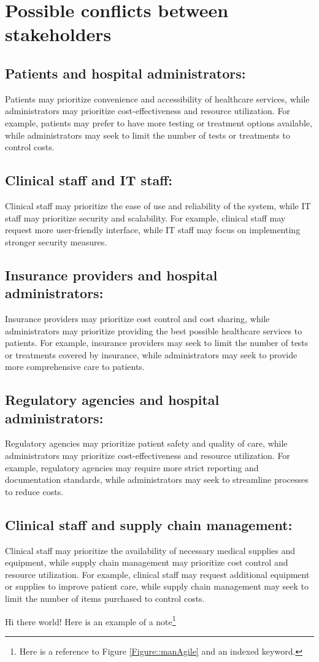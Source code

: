  \section{Possible conflicts between stakeholders}
\subsection{Patients and hospital administrators:} Patients may prioritize convenience and accessibility of healthcare services, while administrators may prioritize cost-effectiveness and resource utilization. For example, patients may prefer to have more testing or treatment options available, while administrators may seek to limit the number of tests or treatments to control costs.
\subsection{Clinical staff and IT staff:} Clinical staff may prioritize the ease of use and reliability of the system, while IT staff may prioritize security and scalability. For example, clinical staff may request more user-friendly interface, while IT staff may focus on implementing stronger security measures.
\subsection{Insurance providers and hospital administrators:} Insurance providers may prioritize cost control and cost sharing, while administrators may prioritize providing the best possible healthcare services to patients. For example, insurance providers may seek to limit the number of tests or treatments covered by insurance, while administrators may seek to provide more comprehensive care to patients.
\subsection{Regulatory agencies and hospital administrators:} Regulatory agencies may prioritize patient safety and quality of care, while administrators may prioritize cost-effectiveness and resource utilization. For example, regulatory agencies may require more strict reporting and documentation standards, while administrators may seek to streamline processes to reduce costs.
\subsection{Clinical staff and supply chain management:} Clinical staff may prioritize the availability of necessary medical supplies and equipment, while supply chain management may prioritize cost control and resource utilization. For example, clinical staff may request additional equipment or supplies to improve patient care, while supply chain management may seek to limit the number of items purchased to control costs.


\newpage
Hi there world!  Here is an example of a note\footnote{Here is a reference 
to Figure \ref{Figure::manAgile} and an indexed keyword.}
